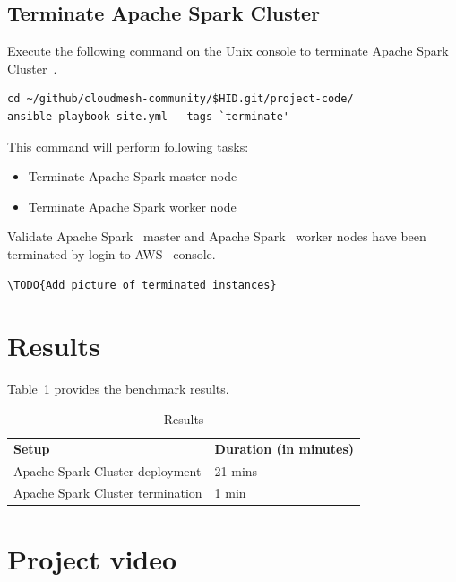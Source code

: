 \subsection{Terminate Apache Spark Cluster}

Execute the following command on the Unix console to terminate Apache
Spark Cluster~\cite{hid-sp18-511-www-spark}.

\begin{verbatim}
cd ~/github/cloudmesh-community/$HID.git/project-code/
ansible-playbook site.yml --tags `terminate'
\end{verbatim}

This command will perform following tasks:

\begin{itemize}
	\item Terminate Apache Spark master node
	\item Terminate Apache Spark worker node
\end{itemize}

Validate Apache Spark~\cite{hid-sp18-511-www-spark} master and Apache Spark~\cite{hid-sp18-511-www-spark}
worker nodes have been terminated by login to AWS~\cite{hid-sp18-511-www-aws} console.

\begin{verbatim}
\TODO{Add picture of terminated instances}
\end{verbatim}

\section{Results}

Table~\ref{t:results-table} provides the benchmark results.

\begin{table}[]
	\centering
	\caption{Results}\label{t:results-table}
	\begin{tabular}{ll} 
		\textbf{Setup} & \textbf{Duration (in minutes)} \\ 
		Apache Spark Cluster deployment  & 21 mins \\
		Apache Spark Cluster termination & 1 min \\
	\end{tabular}
\end{table}

\section{Project video}

